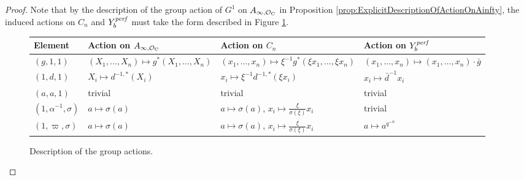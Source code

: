 \documentclass[../main.tex]{subfiles}
\begin{document}
\begin{proof}
Note that by the description of the group action of $G^1$ on $A_{\infty, \mathcal{O}_{\mathrm{C}}}$
in Proposition \ref{prop:ExplicitDescriptionOfActionOnAinfty}, the induced
actions on $C_n$ and $Y_b^{\mathit{perf}}$ must take the form described in Figure
\ref{fig:TableOfGroupActionsOnModels}. 

\begin{figure}[H] 
\centering
\begin{center}
\begin{tabularx} {0.9\textwidth} { 
  |>{\centering\arraybackslash}X ||>{\centering\arraybackslash}X
  |>{\centering\arraybackslash}X |>{\centering\arraybackslash}X | }
 \hline
 Element & Action on $A_{\infty,\mathcal{O}_{\mathrm{C}}}$ & Action on $C_n$ & Action on
 $Y_b^{\mathit{perf}}$ \\ [0.5ex] 
 \hline\hline
 $(g,1,1)$ & $(X_1, \dots, X_n) \mapsto g^*(X_1, \dots, X_n)$ & $(x_1, \dots,
 x_n) \mapsto \xi^{-1}g^*(\xi x_1, \dots, \xi x_n)$ & $(x_1,\dots, x_n) \mapsto (x_1,
 \dots, x_n)\cdot\bar g$\\ 
 \hline
 $(1,d,1)$ & $X_i \mapsto d^{-1, *}(X_i)$ & $x_i \mapsto \xi^{-1} d^{-1, *}(\xi
 x_i)$ & $x_i
 \mapsto \bar d^{-1} x_i$ \\
 \hline
 $(a,a,1)$ & trivial & trivial & trivial \\
 \hline
 $(1, \alpha^{-1}, \sigma)$ & $a \mapsto \sigma(a)$& $a \mapsto \sigma(a)$, $x_i \mapsto  \tfrac{\xi}{\sigma(\xi)} x_i$ & trivial \\
 \hline
 $(1, \varpi, \sigma)$ & $a \mapsto \sigma(a)$& $a \mapsto \sigma(a)$, $x_i \mapsto
 \tfrac{\xi}{\sigma(\xi)} x_i$ & $a
 \mapsto a^{q^{-n}}$ \\ [1ex] 
 \hline
\end{tabularx}
\end{center}
\caption{Description of the group actions.}
\label{fig:TableOfGroupActionsOnModels}
\end{figure}


\end{proof}
\end{document}

